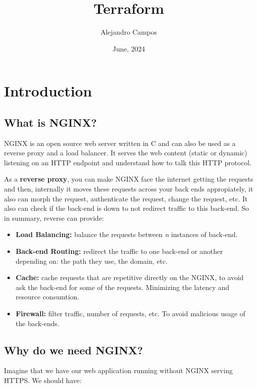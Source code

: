 \documentclass{article}
\title{\textbf{Terraform}}
\author{Alejandro Campos}
\date{June, 2024}
\begin{document}
\maketitle
\newpage
\tableofcontents
\newpage

\newpage
\section{Introduction}

\subsection{What is NGINX?}

NGINX is an open source web server written in C and can also be used as a reverse proxy and a load balancer. It serves the web content (static or dynamic) listening on an HTTP endpoint and understand how to talk this HTTP protocol.

As a \textbf{reverse proxy}, you can make NGINX face the internet getting the requests and then, internally it moves these requests across your back ends appropiately, it also can morph the request, authenticate the request, change the request, etc. It also can check if the back-end is down to not redirect traffic to this back-end. So in summary, reverse can provide:
\begin{itemize}
    \item \textbf{Load Balancing:} balance the requests between \textit{n} instances of back-end.
    \item \textbf{Back-end Routing:} redirect the traffic to one back-end or another depending on: the path they use, the domain, etc.
    \item \textbf{Cache:} cache requests that are repetitive directly on the NGINX, to avoid ask the back-end for some of the requests. Minimizing the latency and resource consumtion.
    \item \textbf{Firewall:} filter traffic, number of requests, etc. To avoid malicious usage of the back-ends.
\end{itemize}

\subsection{Why do we need NGINX?}

Imagine that we have our web application running without NGINX serving HTTPS. We should have:
\end{document}
